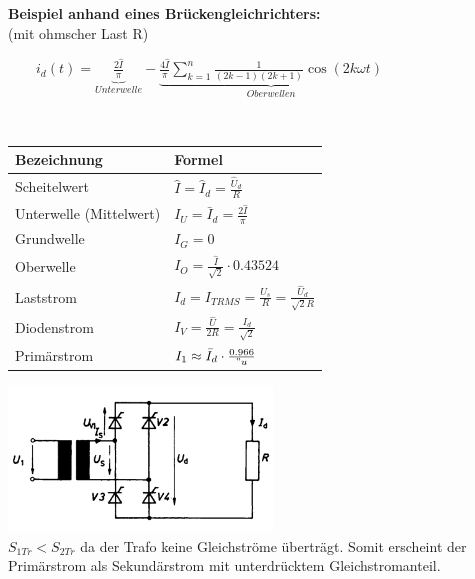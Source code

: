 	\begin{minipage}[c]{8cm} 
	   \textbf{Beispiel anhand eines Brückengleichrichters:}	  	\\
	   (mit ohmscher Last R)
	\end{minipage}   
	\begin{minipage}[c]{10cm} 	
	   $ \qquad i_d(t) = \underbrace{\frac{2 \hat{I}}{\pi}}_{Unterwelle} - \underbrace{\frac{4\hat{I}}{\pi} \sum\limits_{k=1}^n \frac{1}{(2k-1)(2k+1)} \cos(2k\omega t)}_{Oberwellen} $
	\end{minipage}\\
\begin{minipage}[c]{10cm}  
		\begin{tabular}{| l | l |}
    		\hline 
      		\textbf{Bezeichnung}
      		& \textbf{Formel} \\
      		\hline
      		Scheitelwert 
      		& $\hat{I} = \hat{I}_d = \frac{\hat{U}_d}{R} $ \\
      		Unterwelle (Mittelwert)
      		& $I_U = \bar{I}_d = \frac{2 \hat{I}}{\pi}$ \\
      		Grundwelle
      		& $I_G = 0$ \\
      		Oberwelle
      		& $I_O = \frac{\hat{I}}{\sqrt{2}} \cdot 0.43524$ \\
      		Laststrom
      		& $I_{d} = I_{TRMS} =  \frac{U_s}{R}= \frac{\hat{U}_d}{\sqrt{2}R}$ \\ 
      		Diodenstrom
      		& $I_{V} = \frac{\hat{U}}{2 R} = \frac{I_{d}}{\sqrt{2}}$ \\
      		Prim\"arstrom
      		& $I_1 \approx \bar{I}_d \cdot \frac{0.966}{"u}$ \\
      	 	\hline
    	\end{tabular}
	\end{minipage}   
	\begin{minipage}[c]{8cm}  
			\includegraphics[width=7cm]{bilder/brueckengleichrichter.png}  \\			
	$S_{1Tr} < S_{2Tr}$ da der Trafo keine Gleichstr\"ome übertr\"agt. Somit erscheint der Prim\"arstrom
	als Sekund\"arstrom mit unterdrücktem Gleichstromanteil.			
	\end{minipage}
